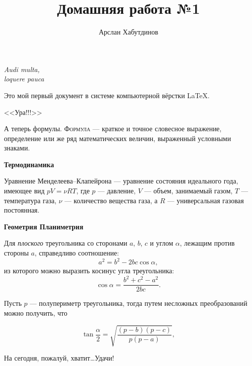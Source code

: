 \documentclass[12pt]{article}
\title{Домашняя работа №1}
\author{Арслан Хабутдинов}
\date{}
\begin{document}
	\maketitle
	\begin{flushright}
	{
	\textit{
	Audi multa, \\
	loquere pauca
	}
	}
	\end{flushright}
	\vspace{6pt}
	\begin{center}
	Это мой первый документ в системе компьютерной вёрстки \LaTeX.
	\end{center}
	\begin{center}
	\vspace{4pt}
	{
	\Huge
	\sffamily
	<<Ура!!!>>
	}
	
	\end{center}
	\hspace{14pt}
	А теперь формулы. \textsc{Формула} --- краткое и точное словесное выражение, определение или же ряд математических величин, выраженный условными знаками.
	
	\vspace{15pt}
	\hspace{14pt}
	{
	\bfseries
	\Large
	Термодинамика
	}
	
	Уравнение Менделеева--Клапейрона --- уравнение состояния идеального года, имеющее вид $pV = \nu RT$, где $p$ --- давление, $V$ --- объем, занимаемый газом, $T$ --- температура газа, $\nu$ --- количество вещества газа, а $R$ --- универсальная газовая постоянная.
	
	\vspace{15pt}
	\hspace{14pt}
	{
	\bfseries
	\Large
	Геометрия \hfill Планиметрия
	}
	
	Для \textsl{плоского} треугольника со сторонами $a$, $b$, $c$ и углом $\alpha$, лежащим против стороны $a$, справедливо соотношение:
	$$
	a^2=b^2-2bc\cos{\alpha},
	$$
	из которого можно выразить косинус угла треугольника:
	$$
	\cos{\alpha} = \frac{b^2+c^2-a^2}{2bc}.
	$$
	
	Пусть $p$ --- полупериметр треугольника, тогда путем несложных преобразований можно получить, что 
	
	$$
	\tan{\frac{\alpha}{2}} = \sqrt{\frac{(p-b)(p-c)}{p(p-a)}},
	$$
	\vspace{0.5776cm}
	
	\begin{flushleft}
	На сегодня, пожалуй, хватит\dots Удачи!
	\end{flushleft}
\end{document}
